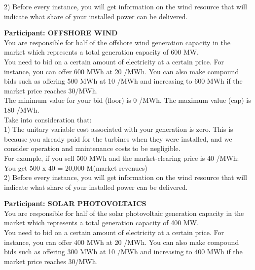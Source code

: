 \documentclass[3p]{elsarticle} %
\begin{document}
2)	Before every instance, you will get information on the wind resource that will indicate what share of your installed power can be delivered. 

\newpage

\textbf{Participant: OFFSHORE WIND} \\

You are responsible for half of the offshore wind generation capacity in the market which represents a total generation capacity of 600 MW. \\

You need to bid on a certain amount of electricity at a certain price. For instance, you can offer 600 MWh at 20 \EUR/MWh. You can also make compound bids such as offering 500 MWh at 10 \EUR/MWh and increasing to 600 MWh if the market price reaches 30\EUR/MWh. \\

The minimum value for your bid (floor) is 0 \EUR/MWh. The maximum value (cap) is 180 \EUR/MWh. \\

Take into consideration that: \\

1)	The unitary variable cost associated with your generation is zero. This is because you already paid for the turbines when they were installed, and we consider operation and maintenance costs to be negligible. \\

For example, if you sell 500 MWh and the market-clearing price is 40 \EUR/MWh:\\

You get 500 x 40 = 20,000 M\EUR (market revenues) \\

2)	Before every instance, you will get information on the wind resource that will indicate what share of your installed power can be delivered. \\

\newpage

\textbf{Participant: SOLAR PHOTOVOLTAICS} \\

You are responsible for half of the solar photovoltaic generation capacity in the market which represents a total generation capacity of 400 MW. \\

You need to bid on a certain amount of electricity at a certain price. For instance, you can offer 400 MWh at 20 \EUR/MWh. You can also make compound bids such as offering 300 MWh at 10 \EUR/MWh and increasing to 400 MWh if the market price reaches 30\EUR/MWh. \\
\end{document}
